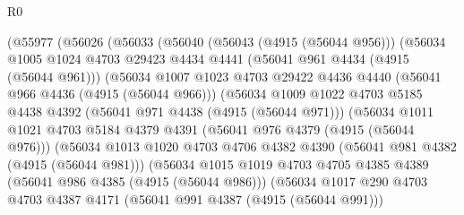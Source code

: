 \begin{lexlean}{R0}
\begin{coremodule}
                  (@55977
                    (@56026
                      (@56033
                        (@56040
                          (@56043 (@4915 (@56044 @956)))
                          (@56034
                            @1005
                            @1024
                            @4703
                            @29423
                            @4434
                            @4441
                            (@56041 @961 @4434 (@4915 (@56044 @961)))
                            (@56034
                              @1007
                              @1023
                              @4703
                              @29422
                              @4436
                              @4440
                              (@56041 @966 @4436 (@4915 (@56044 @966)))
                              (@56034
                                @1009
                                @1022
                                @4703
                                @5185
                                @4438
                                @4392
                                (@56041 @971 @4438 (@4915 (@56044 @971)))
                                (@56034
                                  @1011
                                  @1021
                                  @4703
                                  @5184
                                  @4379
                                  @4391
                                  (@56041 @976 @4379 (@4915 (@56044 @976)))
                                  (@56034
                                    @1013
                                    @1020
                                    @4703
                                    @4706
                                    @4382
                                    @4390
                                    (@56041 @981 @4382 (@4915 (@56044 @981)))
                                    (@56034
                                      @1015
                                      @1019
                                      @4703
                                      @4705
                                      @4385
                                      @4389
                                      (@56041 @986 @4385 (@4915 (@56044 @986)))
                                      (@56034
                                        @1017
                                        @290
                                        @4703
                                        @4703
                                        @4387
                                        @4171
                                        (@56041 @991 @4387 (@4915 (@56044 @991)))

\end{coremodule}
\end{lexlean}
